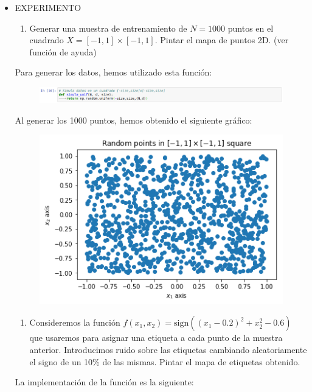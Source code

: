 \documentclass[11pt,a4paper]{article}
\newcommand{\sign}{\text{sign}}
\begin{document}
\begin{itemize}
	\item EXPERIMENTO
	\begin{enumerate}[label=\alph*)]
		\item Generar una muestra de entrenamiento de $N = 1000$ puntos en el cuadrado $X = [-1, 1] \times [-1, 1]$.
		Pintar el mapa de puntos 2D. (ver función de ayuda)
	\end{enumerate}
	
	Para generar los datos, hemos utilizado esta función:
	
	\begin{figure}[H]
	\centering
	\includegraphics[scale=0.4]{img/simula_unif.png}
	\end{figure}
	
	Al generar los 1000 puntos, hemos obtenido el siguiente gráfico:
	
	\begin{figure}[H]
	\centering
	\includegraphics[scale=0.6]{img/random_points.png}
	\end{figure}
	
	\begin{enumerate}[resume, label=\alph*)]
		\item Consideremos la función $f(x_1, x_2) = \sign((x_1 - 0.2)^2 + x_2^2 - 0.6)$ que usaremos para asignar una
		etiqueta a cada punto de la muestra anterior. Introducimos ruido sobre las etiquetas cambiando aleatoriamente
		el signo de un 10\% de las mismas. Pintar el mapa de etiquetas obtenido.
	\end{enumerate}
	
	La implementación de la función es la siguiente:
	

\end{itemize}
\end{document}
